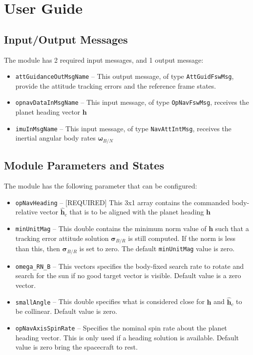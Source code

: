 
\section{User Guide}
\subsection{Input/Output Messages}
The module has 2 required input messages, and 1 output message:
\begin{itemize}
	\item {\tt attGuidanceOutMsgName} -- This output message, of type {\tt AttGuidFswMsg}, provide the attitude tracking errors and the reference frame states.
	\item {\tt opnavDataInMsgName} -- This input message, of type {\tt OpNavFswMsg}, receives the planet heading vector $\bm h$
	\item {\tt imuInMsgName} -- This input message, of type {\tt NavAttIntMsg}, receives the inertial angular body rates $\bm \omega_{B/N}$
\end{itemize}

\subsection{Module Parameters and States}
The module has the following parameter that can be configured:
\begin{itemize}
	\item {\tt opNavHeading} -- [REQUIRED] This 3x1 array contains the commanded body-relative vector $\hat{\bm h}_{c}$ that is to be aligned with the planet heading $\bm h$
	
	\item {\tt minUnitMag} -- This double contains the minimum norm value of $\bm h$ such that a tracking error attitude solution $\bm\sigma_{B/R}$ is still computed.  If the norm is less than this, then $\bm\sigma_{B/R}$ is set to zero.  The default {\tt minUnitMag} value is zero. 
	
	\item {\tt omega\_RN\_B} -- This vectors specifies the body-fixed search rate to rotate and search for the sun if no good target vector is visible.  Default value is a zero vector.  

	\item {\tt smallAngle} -- This double specifies what is considered close for $\bm h$ and $\hat{\bm h}_{c}$ to be collinear.  Default value is zero.  
	
	\item {\tt opNavAxisSpinRate} -- Specifies the nominal spin rate about the planet heading vector.  This is only used if a heading solution is available.  Default value is zero bring the spacecraft to rest. 
	
\end{itemize}

